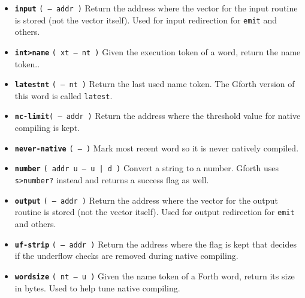 \begin{itemize}
        \item \textbf{\texttt{input}} \texttt{( -- addr )} 
                Return the address where the vector for the input routine is
                stored (not the vector itself). Used for input redirection for 
                \texttt{emit} and others. 

        \item \textbf{\texttt{int>name}} \texttt{( xt -- nt )} 
                Given the execution token of a
                word, return the name token.. 
                
        \item \textbf{\texttt{latestnt}} \texttt{( -- nt )} 
                Return the last used name token. The Gforth
                version of this word is called
                \texttt{latest}.

        \item \textbf{\texttt{nc-limit}}\texttt{( -- addr )} 
                Return the address where the threshold value for native
                compiling is kept.  

        \item \textbf{\texttt{never-native}} \texttt{( -- )} 
                Mark most recent word so it is never natively compiled.

        \item \textbf{\texttt{number}} 
                \texttt{( addr u -- u | d )} Convert a string to a number.
                Gforth uses
                \texttt{s>number?} instead
                and returns a success flag as well. 

        \item \textbf{\texttt{output}} \texttt{( -- addr )} 
                Return the address where the vector for the output routine is
                stored (not the vector itself). Used for output redirection for 
                \texttt{emit} and others. 

        \item \textbf{\texttt{uf-strip}} \texttt{( -- addr )} 
                Return the address where the flag is kept that decides if
                the underflow checks are removed during native
                compiling.

        \item \textbf{\texttt{wordsize}}
                \texttt{( nt -- u )} Given the name token  of
                a Forth word, return its size in bytes. Used to help tune 
                native compiling.

\end{itemize}


